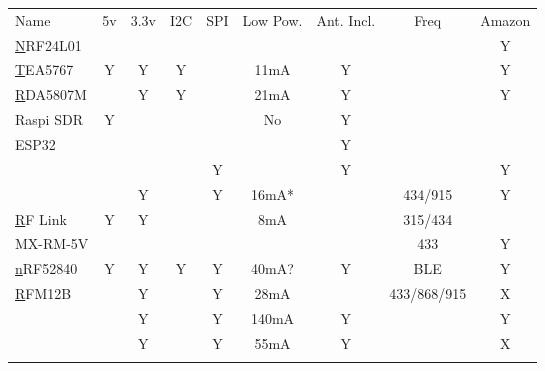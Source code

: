 \documentclass{article}
\begin{document}
\begin{table}[]
\begin{tabular}{lcccccccc}
\rowcolor[HTML]{E7E6E6} 
{\color[HTML]{44546A} Name} & {\color[HTML]{44546A} 5v} & {\color[HTML]{44546A} 3.3v} & {\color[HTML]{44546A} I2C} & {\color[HTML]{44546A} SPI} & {\color[HTML]{44546A} Low Pow.} & {\color[HTML]{44546A} Ant. Incl.} & {\color[HTML]{44546A} Freq} & {\color[HTML]{44546A} Amazon} \\
{\color[HTML]{0563C1} {\ul NRF24L01}} &  &  &  &  &  &  &  & Y \\
{\color[HTML]{0563C1} {\ul TEA5767}} & Y & Y & Y &  & 11mA & Y &  & Y \\
{\color[HTML]{0563C1} {\ul RDA5807M}} &  & Y & Y &  & 21mA & Y &  & Y \\
Raspi SDR & Y &  &  &  & No & Y &  &  \\
\cellcolor[HTML]{FFFF00}ESP32 &  &  &  &  &  & Y &  &  \\
\cellcolor[HTML]{FFFF00}{\color[HTML]{0563C1} {\ul ESP8266}} &  &  &  & Y &  & Y &  & Y \\
\cellcolor[HTML]{FFFF00}{\color[HTML]{0563C1} {\ul RFM69HCW}} &  & Y &  & Y & 16mA* &  & 434/915 & Y \\
{\color[HTML]{0563C1} {\ul RF Link}} & Y & Y &  &  & 8mA &  & 315/434 &  \\
MX-RM-5V &  &  &  &  &  &  & 433 & Y \\
{\color[HTML]{0563C1} {\ul nRF52840}} & Y & Y & Y & Y & 40mA? & Y & BLE & Y \\
{\color[HTML]{0563C1} {\ul RFM12B}} &  & Y &  & Y & 28mA &  & 433/868/915 & X \\
\cellcolor[HTML]{FFFF00}{\color[HTML]{0563C1} {\ul DWM1000}} &  & Y &  & Y & 140mA & Y &  & Y \\
\cellcolor[HTML]{E2EFDA}{\color[HTML]{0563C1} {\ul DWM3000}} &  & Y &  & Y & 55mA & Y &  & X \\
 &  &  &  &  &  &  &  & 
\end{tabular}
\end{table}
\newpage
\end{document}
